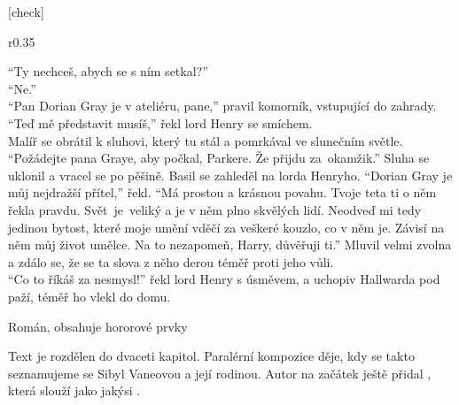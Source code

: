 \documentclass{extarticle} %
\begin{document}
[check]

\noindent\begin{wrapfigure}{r}{0.35\textwidth}
\tiny

\setlength{\parindent}{3pt}
\noindent
\enquote{Ty nechceš, abych se s ním setkal?} \\
\enquote{Ne.} \\
\enquote{Pan Dorian Gray je v ateliéru, pane,} pravil komorník, vstupující do zahrady. \\
\enquote{Teď mě představit musíš,} řekl lord Henry se smíchem. \\
Malíř se obrátil k sluhovi, který tu stál a pomrkával ve slunečním světle.
\enquote{Požádejte pana Graye, aby počkal, Parkere. Že přijdu za~okamžik.}
Sluha se uklonil a vracel se po pěšině.
Basil se zahleděl na lorda Henryho.
\enquote{Dorian Gray je můj nejdražší přítel,} řekl.
\enquote{Má prostou a krásnou povahu.
Tvoje teta ti o něm řekla pravdu.
Svět~je~veliký a je v něm plno skvělých lidí.
Neodveď mi tedy jedinou bytost, které moje umění vděčí za veškeré kouzlo, co v něm je.
Závisí na něm můj život umělce.
Na to nezapomeň, Harry, důvěřuji ti.}
Mluvil velmi zvolna a zdálo se, že se ta slova z něho derou téměř proti jeho vůli. \\
\enquote{Co to říkáš za nesmysl!} řekl lord Henry s úsměvem, a uchopiv Hallwarda pod paží,
téměř ho vlekl do domu. 
\end{wrapfigure}


\noindent
Román, obsahuje hororové prvky





\noindent 
Text je rozdělen do dvaceti kapitol.
Paralérní kompozice děje, kdy se takto seznamujeme se Sibyl Vaneovou a její rodinou.
Autor na začátek ještě přidal , která slouží jako jakýsi .
\end{document}
